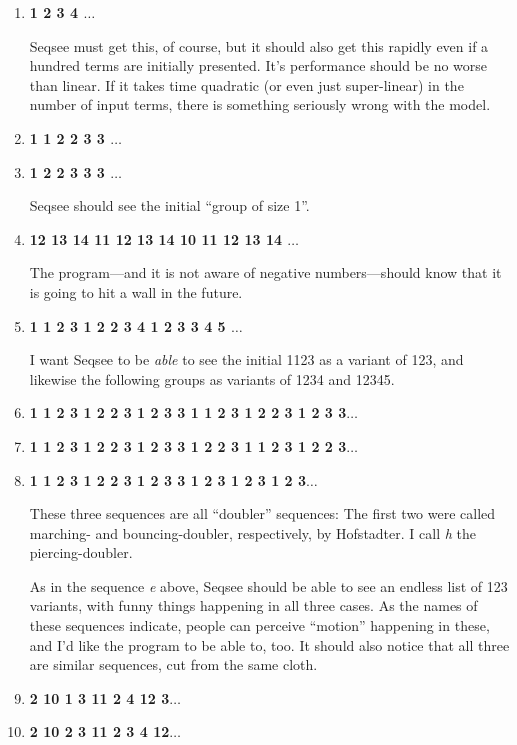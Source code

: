 \documentclass[letterpaper]{article}
\begin{document}
\renewcommand{\theenumi}{\alph{enumi}}
\begin{enumerate}
\item \textbf{1 2 3 4 $\ldots$}

Seqsee must get this, of course, but it should also get this rapidly even if a hundred terms are initially presented. It's performance should be no worse than linear. If it takes time quadratic (or even just super-linear) in the number of input terms, there is something seriously wrong with the model.

\item \textbf{ 1 1 2 2 3 3 $\ldots$}
\item \textbf{ 1 2 2 3 3 3 $\ldots$}

Seqsee should see the initial ``group of size 1''.

\item \textbf{12 13 14 11 12 13 14 10 11 12 13 14 $\ldots$}

The program---and it is not aware of negative numbers---should know that it is going to hit a wall in the future.

\item \textbf{1 1 2 3 1 2 2 3 4 1 2 3 3 4 5 $\ldots$}

I want Seqsee to be \emph{able} to see the initial 1123 as a variant of 123, and likewise the following groups as variants of 1234 and 12345.

\item \textbf{1 1 2 3 1 2 2 3 1 2 3 3 1 1 2 3 1 2 2 3 1 2 3 3$\ldots$}
\item \textbf{1 1 2 3 1 2 2 3 1 2 3 3 1 2 2 3 1 1 2 3 1 2 2 3$\ldots$}
\item \textbf{1 1 2 3 1 2 2 3 1 2 3 3 1 2 3 1 2 3 1 2 3$\ldots$}

These three sequences are all ``doubler'' sequences: The first two were called marching- and bouncing-doubler, respectively, by Hofstadter. I call \emph{h} the piercing-doubler.

As in the sequence \emph{e} above, Seqsee should be able to see an endless list of 123 variants, with funny things happening in all three cases. As the names of these sequences indicate, people can perceive ``motion'' happening in these, and I'd like the program to be able to, too. It should also notice that all three are similar sequences, cut from the same cloth.

\item \textbf{ 2 10 1 3 11 2 4 12 3$\ldots$}
\item \textbf{ 2 10 2 3 11 2 3 4 12$\ldots$}


\end{enumerate}
\end{document}
